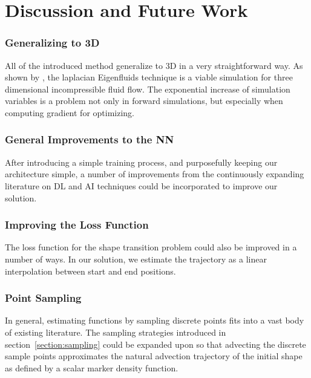 \chapter{Discussion and Future Work}


\subsection*{Generalizing to 3D}
All of the introduced method generalize to 3D in a very straightforward way. As
shown by \cite{scalable-eigenfluids}, the laplacian Eigenfluids technique is
a viable simulation for three dimensional incompressible fluid flow. The
exponential increase of simulation variables is a problem not only in forward
simulations, but especially when computing gradient for optimizing. 

\subsection*{General Improvements to the NN}
After introducing a simple training process, and purposefully keeping our
architecture simple, a number of improvements from the continuously expanding
literature on \ac{DL} and \ac{AI} techniques could be incorporated to improve
our solution.

\subsection*{Improving the Loss Function}
The loss function for the shape transition problem could also be improved in
a number of ways. In our solution, we estimate the trajectory as a linear
interpolation between start and end positions. \

\subsection*{Point Sampling}
In general, estimating functions by sampling discrete points fits into a vast
body of existing literature. The sampling strategies introduced in
section~\ref{section:sampling} could be expanded upon so that advecting the
discrete sample points approximates the natural advection trajectory of the
initial shape as defined by a scalar marker density function.


